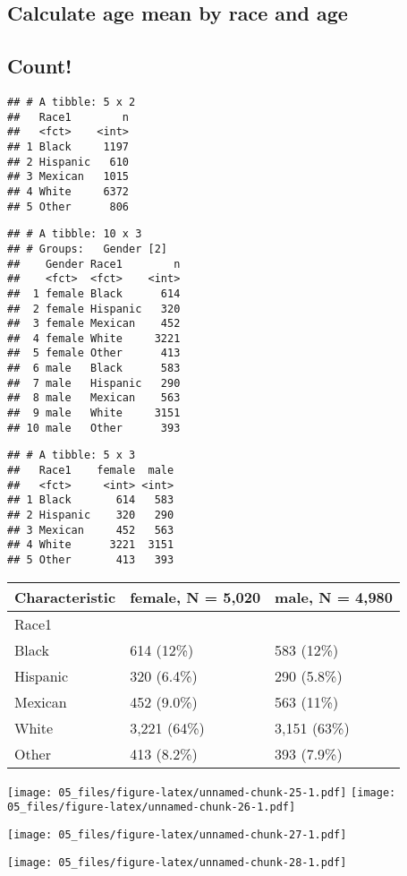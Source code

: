 \documentclass[
]{article}
\begin{document}
\hypertarget{calculate-age-mean-by-race-and-age}{%
\subsection{Calculate age mean by race and
age}\label{calculate-age-mean-by-race-and-age}}

\hypertarget{count}{%
\subsection{Count!}\label{count}}

\begin{verbatim}
## # A tibble: 5 x 2
##   Race1        n
##   <fct>    <int>
## 1 Black     1197
## 2 Hispanic   610
## 3 Mexican   1015
## 4 White     6372
## 5 Other      806
\end{verbatim}

\begin{verbatim}
## # A tibble: 10 x 3
## # Groups:   Gender [2]
##    Gender Race1        n
##    <fct>  <fct>    <int>
##  1 female Black      614
##  2 female Hispanic   320
##  3 female Mexican    452
##  4 female White     3221
##  5 female Other      413
##  6 male   Black      583
##  7 male   Hispanic   290
##  8 male   Mexican    563
##  9 male   White     3151
## 10 male   Other      393
\end{verbatim}

\begin{verbatim}
## # A tibble: 5 x 3
##   Race1    female  male
##   <fct>     <int> <int>
## 1 Black       614   583
## 2 Hispanic    320   290
## 3 Mexican     452   563
## 4 White      3221  3151
## 5 Other       413   393
\end{verbatim}

\begin{longtable}[]{@{}lll@{}}
\toprule
\textbf{Characteristic} & \textbf{female}, N = 5,020 & \textbf{male}, N
= 4,980\tabularnewline
\midrule
\endhead
Race1 & &\tabularnewline
Black & 614 (12\%) & 583 (12\%)\tabularnewline
Hispanic & 320 (6.4\%) & 290 (5.8\%)\tabularnewline
Mexican & 452 (9.0\%) & 563 (11\%)\tabularnewline
White & 3,221 (64\%) & 3,151 (63\%)\tabularnewline
Other & 413 (8.2\%) & 393 (7.9\%)\tabularnewline
\bottomrule
\end{longtable}

\texttt{[image: 05\_files/figure-latex/unnamed-chunk-25-1.pdf]}
\texttt{[image: 05\_files/figure-latex/unnamed-chunk-26-1.pdf]}

\texttt{[image: 05\_files/figure-latex/unnamed-chunk-27-1.pdf]}

\texttt{[image: 05\_files/figure-latex/unnamed-chunk-28-1.pdf]}
\end{document}
